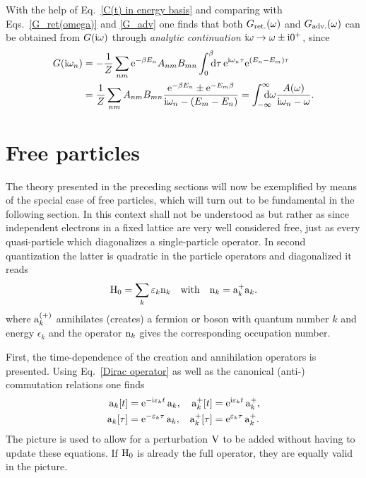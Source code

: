 With the help of Eq.~\ref{C(t) in energy basis} and comparing with
Eqs.~\ref{G_ret(omega)} and \ref{G_adv} one finds that both $G \sb{\text{ret.}}
(\omega)$ and $G \sb{\text{adv.}} (\omega)$ can be obtained from $G(\mathrm i \omega)$
through \emph{analytic continuation} $\mathrm i \omega \rightarrow \omega \pm \mathrm i 0^+$,
since
%
\begin{equation} \label{G(i omega_n)}
    \begin{split}
        G(\I \omega_n) &= -\frac 1 Z \sum_{n m}
        \E^{-\beta E_n} A_{n m} B_{m n}
        \int \from 0 \till \beta \D \tau \,
        \E^{\I \omega_n \tau} \E^{(E_n - E_m) \tau} \\
        &=
        \frac 1 Z \sum_{n m} A_{n m} B_{m n}
        \frac{\E^{-\beta E_n} \pm \E^{-E_m \beta}}{\I \omega_n - (E_m - E_n)}
        = \int \from{-\infty} \till \infty \D \omega
        \frac{A(\omega)}{\I \omega_n - \omega}.
    \end{split}
\end{equation}

\section{Free particles}
\label{free particles}

The theory presented in the preceding sections will now be exemplified by means
of the special case of free particles, which will turn out to be fundamental in
the following section. In this context  shall not be understood as
 but rather as  since independent
 electrons in a fixed lattice are very well considered free, just as
every quasi-particle which diagonalizes a single-particle 
operator. In second quantization the latter is quadratic in the particle
operators and diagonalized it reads
%
\begin{equation} \label{H_0}
    \mathrm H_0 = \sum_k \varepsilon_k \mathrm n_k
    \quad \text{with} \quad
    \mathrm n_k = \mathrm a_k^+ \mathrm a_k.
\end{equation}
%
where $\mathrm a_k^{(+)}$ annihilates (creates) a fermion or boson with quantum
number $k$ and energy $\epsilon_k$ and the operator $\mathrm n_k$ gives the
corresponding occupation number.

First, the time-dependence of the creation and annihilation operators is
presented. Using Eq.~\ref{Dirac operator} as well as the canonical (anti-)
commutation relations one finds
%
\begin{equation} \label{time-dependent ladder operators}
    \begin{aligned}
        \mathrm a_k[t] &= \mathrm e^{-\mathrm i \varepsilon_k t} \, \mathrm a_k, &
        \mathrm a_k^+[t] &= \mathrm e^{\mathrm i \varepsilon_k t} \, \mathrm a_k^+, \\
        \mathrm a_k[\tau] &= \mathrm e^{-\varepsilon_k \tau} \, \mathrm a_k, &
        \mathrm a_k^+[\tau] &= \mathrm e^{\varepsilon_k \tau} \, \mathrm a_k^+.
    \end{aligned}
\end{equation}
%
The  picture is used to allow for a perturbation $\mathrm V$ to be added
without having to update these equations. If $\mathrm H_0$ is already the full
 operator, they are equally valid in the 
picture.

